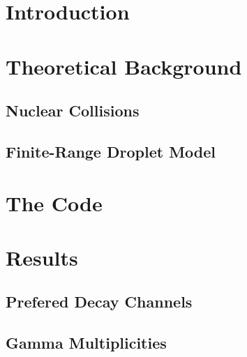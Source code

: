 
\setcounter{page}{1}
\tableofcontents
\clearpage

\pagestyle{scrheadings}
\ofoot[\pagemark]{\pagemark}
\cfoot[]{}

\setlength{\oddsidemargin}{8pt}
\setlength{\evensidemargin}{23pt}

%

\newpage
{}
\setcounter{page}{1}

\chapter{Introduction}
\label{sec:intro}


\chapter{Theoretical Background}
\label{sec:theory}

\section{Nuclear Collisions}
\label{sec:theory:nuc-col}

\section{Finite-Range Droplet Model}
\label{sec:frdm1995}



\chapter{The Code}
\label{sec:code}


\chapter{Results}
\label{sec:results}
\section{Prefered Decay Channels}


\section{Gamma Multiplicities}


